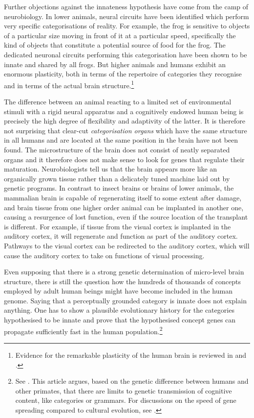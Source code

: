 Further objections against the innateness hypothesis have come from the camp 
of neurobiology. In lower animals, neural circuits have been identified which perform 
very specific categorisations of reality. For example, the 
frog is sensitive to objects of a particular
size moving in front of it at a particular speed, specifically the
kind of objects that constitute a potential 
source of food for the frog. The dedicated neuronal 
circuits performing this categorisation have been 
shown to be innate and shared by all frogs. But higher 
animals and humans
exhibit an enormous plasticity, both in terms of the 
repertoire of categories they recognise and in terms of 
the actual brain structure.\footnote{
Evidence for the remarkable plasticity of the human 
brain is reviewed in \cite{Edelman:1987} and \cite{Elman:1998}. }

The difference between an animal
reacting to a limited set of environmental stimuli with 
a rigid neural apparatus and a cognitively endowed
human being is precisely the high degree of flexibility and 
adaptivity of the latter.
It is therefore not surprising that clear-cut 
{\it categorisation organs} which have the same structure in 
all humans and are located at the same position in the 
brain have not been found. The microstructure of the
brain does not consist of
neatly separated organs and it therefore does not make 
sense to look for genes that regulate their maturation. 
Neurobiologists tell us that 
the brain appears more like an organically grown 
tissue rather than a delicately tuned machine laid
out by genetic programs. In contrast to insect brains or 
brains of lower animals, the mammalian brain is 
capable of regenerating itself to some extent after
damage, and brain tissue
from one higher order animal can be implanted in another
one, causing a resurgence of lost function, even if the 
source location of the transplant is different. 
For example, if tissue from the visual cortex is
implanted in the auditory cortex, it will 
regenerate and function as part of the auditory 
cortex. Pathways to the visual cortex can be
redirected to the auditory cortex, which will cause 
the auditory cortex to take on functions of visual processing. 

Even supposing that there is a strong genetic
determination of micro-level brain structure, there is 
still the question how the hundreds of thousands of concepts 
employed by adult human beings might have become 
included in the human genome. Saying that a perceptually 
grounded category is innate does not explain anything.
One has to show a plausible evolutionary history for 
the categories hypothesised to be innate and prove 
that the hypothesised concept genes can propagate sufficiently 
fast in the human population.\footnote{
See \cite{Worden:1995}. 
This article argues, based on the genetic difference
between humans and other primates, that there are limits 
to genetic transmission of cognitive content, like 
categories or grammars. For discussions on the speed
of gene spreading compared to cultural evolution, 
see \cite{Cavalli:1995}.}

